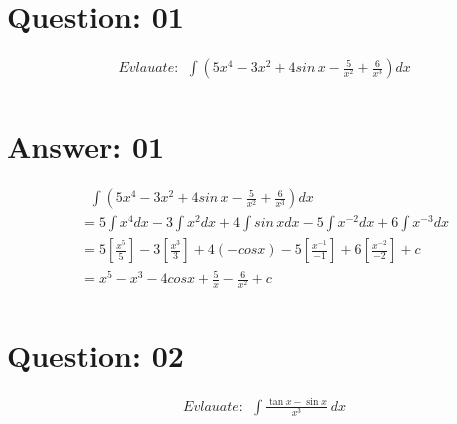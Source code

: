 \documentclass[17pt]{extarticle}
\begin{document}
\noindent

\begin{fleqn} 


\section{Question: 01}

\begin{equation} \nonumber
\begin{alignedat}{4}
& Evlauate :\ \  \int \left( 5x^4-3x^2+4sin\,x - \frac{5}{x^2}+\frac{6}{x^3}\right) dx\\
\end{alignedat}
\end{equation}


\section{Answer: 01}

\begin{equation} \nonumber
\begin{alignedat}{4}
& \texttt{\ \ } \int \left( 5x^4-3x^2+4sin\,x - \frac{5}{x^2}+\frac{6}{x^3}\right) dx\\
&= 5\int x^4dx-3\int x^2dx+4\int sin\,xdx - 5\int {x^{-2}}dx+6\int x^{-3}dx\\
&= 5\left[\frac{x^5}{5}\right]-3\left[\frac{x^3}{3}\right]+4(-cos x)-5\left[\frac{x^{-1}}{-1} \right]+6\left[\frac{x^{-2}}{-2} \right]+c\\
&= x^5 - x^3 - 4cosx + \frac{5}{x} - \frac{6}{x^2}+c\\
\end{alignedat}
\end{equation}


\section{Question: 02}

\begin{equation} \nonumber
\begin{alignedat}{4}
& Evlauate :\ \  \int \frac{\tan{x} - \sin{x}}{x^3}\ dx\\
\end{alignedat}
\end{equation}



\end{fleqn}
\end{document}
